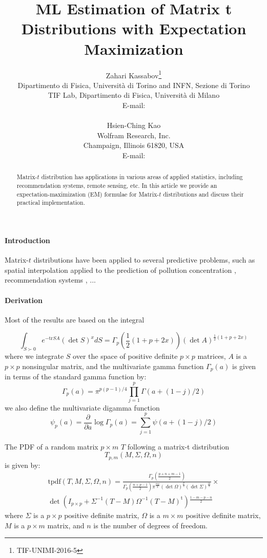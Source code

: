 \documentclass[english,listof=totoc]{scrartcl}
\title{ML Estimation of Matrix t Distributions with Expectation Maximization}
\author{Zahari Kassabov\thanks{TIF-UNIMI-2016-5}\\
        Dipartimento di Fisica, Universit\`a di Torino and INFN, Sezione di Torino\\
		TIF Lab, Dipartimento di Fisica, Universit\`a di Milano\\
        E-mail: \email{kassabov@to.infn.it}\\
        \\
        Hsien-Ching Kao\\
        Wolfram Research, Inc.\\
		Champaign, Illinois 61820, USA\\
		E-mail: \email{sp000088@gmail.com}
		}
\begin{document}
\maketitle

\begin{abstract}
Matrix-$t$ distribution has applications in various areas of applied statistics, including recommendation systems, remote sensing, etc. In this article we provide an expectation-maximization (EM) formulae for Matrix-$t$ distributions and discuss their practical implementation.
\end{abstract}

\paragraph{Introduction}
Matrix-$t$ distributions have been applied to several predictive problems, such as spatial interpolation applied to the prediction of pollution concentration \cite{}, recommendation systems \cite{NIPS2007_3203},
...

\paragraph{Derivation}

Most of the results are based on the integral

\begin{equation}
\int_{S\succ 0}e^{-\textrm{tr}SA}(\det S)^{x}dS=\Gamma_{p}\left(\frac{1}{2}(1+p+2x)\right)(\det A)^{\frac{1}{2}(1+p+2x)}\label{eq:intmultgammadef}
\end{equation}
where we integrate $S$ over the space of positive definite $p\times p$
matrices, $A$ is a $p\times p$ nonsingular matrix, and the multivariate
gamma function $\Gamma_{p}(a)$ is given in terms of the standard
gamma function by:
\begin{equation}
\Gamma_{p}(a)=\pi^{p(p-1)/4}\prod_{j=1}^{p}\Gamma\left(a+(1-j)/2\right)\label{eq:multgammadef}
\end{equation}
we also define the multivariate digamma function
\[
\psi_{p}(a)=\frac{\partial}{\partial a}\log\Gamma_{p}(a)=\sum_{j=1}^{p}\psi(a+(1-j)/2)
\]

The PDF of a random matrix $p\times m$ $T$ following a matrix-t
distribution
\[
T_{p,m}(M,\Sigma,\Omega,n)
\]
is given by:
\begin{equation}
\begin{split}\textrm{tpdf}(T,M,\Sigma,\Omega,n)=\frac{\Gamma_{p}\left(\frac{p+n+m-1}{2}\right)}{\Gamma_{p}\left(\frac{n+p-1}{2}\right)\pi^{\frac{mp}{2}}(\det\Omega)^{\frac{p}{2}}(\det\Sigma)^{\frac{m}{2}}}\times\\
\det\left(I_{p\times p}+\Sigma^{-1}(T-M)\Omega^{-1}(T-M)^{\textrm{t}}\right){}^{\frac{1-m-p-n}{2}}
\end{split}
\label{eq:matrixtpdf}
\end{equation}
where $\Sigma$ is a $p\times p$ positive definite matrix, $\Omega$
is a $m\times m$ positive definite matrix, $M$ is a $p\times m$
matrix, and $n$ is the number of degrees of freedom.
\end{document}
